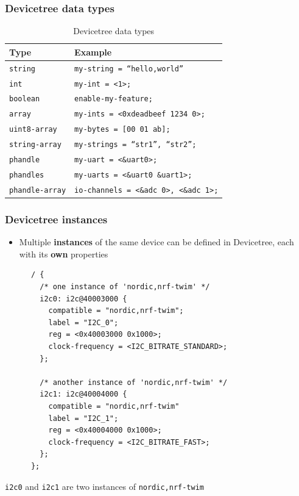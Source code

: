 \documentclass[handout]{beamer}
\begin{document}
\begin{frame}[fragile]
  \frametitle{Devicetree data types}

  \begin{table}
    \centering
    \begin{tabular}{lp{}}
      \toprule
      Type                   & Example                                      \\
      \midrule
      \texttt{string}        & \texttt{my-string = ``hello,world''}         \\
      \texttt{int}           & \texttt{my-int = <1>;}                       \\
      \texttt{boolean}       & \texttt{enable-my-feature;}                  \\
      \texttt{array}         & \texttt{my-ints = <0xdeadbeef 1234 0>;}      \\
      \texttt{uint8-array}   & \texttt{my-bytes = [00 01 ab];}              \\
      \texttt{string-array}  & \texttt{my-strings = ``str1'', ``str2'';}    \\
      \texttt{phandle}       & \texttt{my-uart = <\&uart0>;}                \\
      \texttt{phandles}      & \texttt{my-uarts = <\&uart0 \&uart1>;}       \\
      \texttt{phandle-array} & \texttt{io-channels = <\&adc 0>, <\&adc 1>;} \\
      \bottomrule
    \end{tabular}
    \caption{Devicetree data types}
  \end{table}
\end{frame}

\begin{frame}[fragile]
  \frametitle{Devicetree instances}

  \begin{itemize}
    \item Multiple \textbf{instances} of the same device can be defined in
          Devicetree, each with its \textbf{own} properties
  \end{itemize}

  \begin{listing}[H]
    \begin{verbatim}
      / {
        /* one instance of 'nordic,nrf-twim' */
        i2c0: i2c@40003000 {
          compatible = "nordic,nrf-twim";
          label = "I2C_0";
          reg = <0x40003000 0x1000>;
          clock-frequency = <I2C_BITRATE_STANDARD>;
        };

        /* another instance of 'nordic,nrf-twim' */
        i2c1: i2c@40004000 {
          compatible = "nordic,nrf-twim"
          label = "I2C_1";
          reg = <0x40004000 0x1000>;
          clock-frequency = <I2C_BITRATE_FAST>;
        };
      };
    \end{verbatim}
    \caption{\texttt{i2c0} and \texttt{i2c1} are two instances of
      \texttt{nordic,nrf-twim}}
  \end{listing}
\end{frame}
\end{document}
